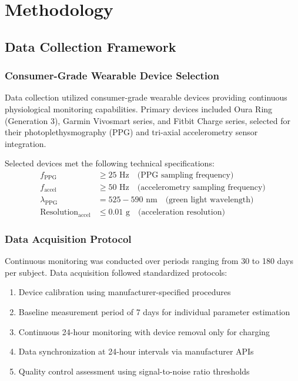 \section{Methodology}

\subsection{Data Collection Framework}

\subsubsection{Consumer-Grade Wearable Device Selection}

Data collection utilized consumer-grade wearable devices providing continuous physiological monitoring capabilities. Primary devices included Oura Ring (Generation 3), Garmin Vivosmart series, and Fitbit Charge series, selected for their photoplethysmography (PPG) and tri-axial accelerometry sensor integration.

\begin{definition}
Selected devices met the following technical specifications:
\begin{align}
f_{\text{PPG}} &\geq 25 \text{ Hz} \quad \text{(PPG sampling frequency)} \\
f_{\text{accel}} &\geq 50 \text{ Hz} \quad \text{(accelerometry sampling frequency)} \\
\lambda_{\text{PPG}} &= 525-590 \text{ nm} \quad \text{(green light wavelength)} \\
\text{Resolution}_{\text{accel}} &\leq 0.01 \text{ g} \quad \text{(acceleration resolution)}
\end{align}
\end{definition}

\subsubsection{Data Acquisition Protocol}

Continuous monitoring was conducted over periods ranging from 30 to 180 days per subject. Data acquisition followed standardized protocols:

\begin{enumerate}
\item Device calibration using manufacturer-specified procedures
\item Baseline measurement period of 7 days for individual parameter estimation
\item Continuous 24-hour monitoring with device removal only for charging
\item Data synchronization at 24-hour intervals via manufacturer APIs
\item Quality control assessment using signal-to-noise ratio thresholds
\end{enumerate}

